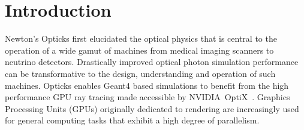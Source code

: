 \documentclass[a4paper]{jpconf}
\begin{document}
%
%
%
%
%
%
%
%

\section{Introduction}

Newton's Opticks\cite{newton} first elucidated the optical physics 
that is central to the operation of a wide gamut of machines from medical imaging 
scanners to neutrino detectors. Drastically improved optical photon simulation 
performance can be transformative to the design, understanding 
and operation of such machines. Opticks\cite{opticksURL} enables Geant4\cite{g4A}\cite{g4B}\cite{g4C}
based simulations to benefit from the high performance GPU ray tracing made accessible
by NVIDIA\textregistered\ OptiX\texttrademark\ \cite{optixPaper}\cite{optixSite}.
Graphics Processing Units (GPUs) originally dedicated to rendering are increasingly
used for general computing tasks that exhibit a high degree of parallelism.
\end{document}
